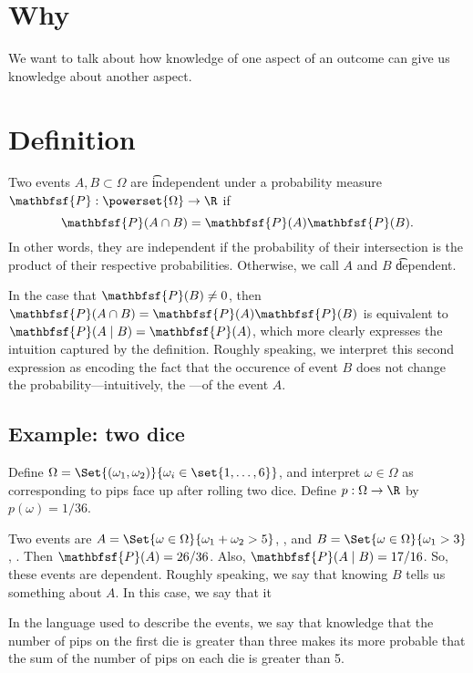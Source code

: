 

\section*{Why}

We want to talk about how knowledge of one aspect of an outcome can give us knowledge about another aspect.

\section*{Definition}

Two events $A, B \subset \Omega $ are \t{independent} under a probability measure $\mathbfsf{P} : \powerset{\Omega } \to \R $ if
    \[
\mathbfsf{P} (A \cap  B) = \mathbfsf{P} (A)\mathbfsf{P} (B).
    \]
In other words, they are independent if the probability of their intersection is the product of their respective probabilities.
Otherwise, we call $A$ and $B$ \t{dependent}.

In the case that $\mathbfsf{P} (B) \neq 0$, then $\mathbfsf{P} (A \cap  B) = \mathbfsf{P} (A)\mathbfsf{P} (B)$ is equivalent to $\mathbfsf{P} (A \mid B) = \mathbfsf{P} (A)$, which more clearly expresses the intuition captured by the definition.
Roughly speaking, we interpret this second expression as encoding the fact that the occurence of event $B$ does not change the probability---intuitively, the ---of the event $A$.

\subsection*{Example: two dice}

Define $\Omega  = \Set{(\omega _1, \omega _2)}{ \omega _i \in \set{1, \dots , 6}}$, and interpret $\omega  \in \Omega $ as corresponding to pips face up after rolling two dice.
Define $p: \Omega  \to \R $ by $p(\omega ) = 1/36$.

Two events are $A = \Set{\omega  \in \Omega }{ \omega _1 + \omega _2 > 5}$, , and $B = \Set{\omega  \in \Omega }{\omega _1 > 3}$, .
Then $\mathbfsf{P} (A) = 26/36$.
Also, $\mathbfsf{P} (A \mid  B) = 17/16$.
So, these events are dependent.
Roughly speaking, we say that knowing $B$ tells us something about $A$.
In this case, we say that it 

In the language used to describe the events, we say that knowledge that the number of pips on the first die is greater than three makes its more probable that the sum of the number of pips on each die is greater than 5.

